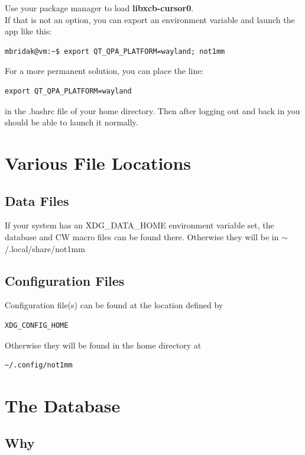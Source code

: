 \documentclass{article}
\begin{document}
\noindent Use your package manager to load \textbf{libxcb-cursor0}.\\
If that is not an option, you can export an environment variable and launch the app like this:

\begin{verbatim}
mbridak@vm:~$ export QT_QPA_PLATFORM=wayland; not1mm
\end{verbatim}

\noindent For a more permanent solution, you can place the line:

\begin{verbatim}
export QT_QPA_PLATFORM=wayland
\end{verbatim}

\noindent in the .bashrc file of your home directory. Then after logging out and back in you should be able to launch it normally.

\section{Various File Locations}

\subsection{Data Files}

If your system has an XDG\_DATA\_HOME environment variable set, the database and CW macro files can be found there. Otherwise they will be in $\sim$/.local/share/not1mm

\subsection{Configuration Files}

Configuration file(s) can be found at the location defined by
\begin{verbatim}XDG_CONFIG_HOME\end{verbatim}
Otherwise they will be found in the home directory at \begin{verbatim}~/.config/not1mm\end{verbatim}
\section{The Database}

\subsection{Why}
\end{document}

